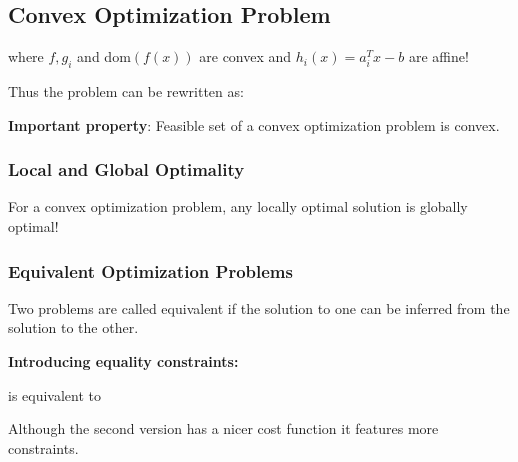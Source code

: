 \documentclass[8pt,a4paper]{scrartcl}
\begin{document}
\begin{multicols*}{3}
\subsection{Convex Optimization Problem}


where $f,g_i$ and dom$(f(x))$ are convex and $h_i(x)=a_i^Tx-b$ are affine!

\finn

Thus the problem can be rewritten as:


\textbf{Important property}: Feasible set of a convex optimization problem is convex.
 

\subsubsection{Local and Global Optimality}

For a convex optimization problem, any locally optimal solution is globally optimal!

\subsubsection{Equivalent Optimization Problems}

Two problems are called equivalent if the solution to one can be inferred from the solution to the other.

\textbf{Introducing equality constraints:}


is equivalent to 


Although the second version has a nicer cost function it features more constraints.

\finn


\end{multicols*}
\end{document}
